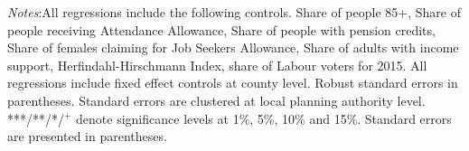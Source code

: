 \documentclass[12pt,letterpaper]{article}
\begin{document}
 
\begin{table}[h!]
\centering
\caption{Robustness checks, effects of house prices on care homes entry}
\label{table robustness}
\begin{tablenotes}
      \scriptsize
      \item {\it{Notes}}:All regressions include the following controls. Share of people 85+, 
      Share of people receiving Attendance Allowance, Share of people with pension credits, 
      Share of females claiming for Job Seekers Allowance, Share of adults with income 
      support, 
      Herfindahl-Hirschmann Index, share of Labour voters for 2015. All regressions include fixed effect controls at
      county level. Robust standard errors in parentheses. Standard errors are clustered at local planning 
      authority level. ***/**/*/$^{+}$ denote significance levels at 1\%, 5\%, 
      10\% and 15\%. Standard errors are presented in parentheses. 
    \end{tablenotes}

\end{table}
\end{document}
